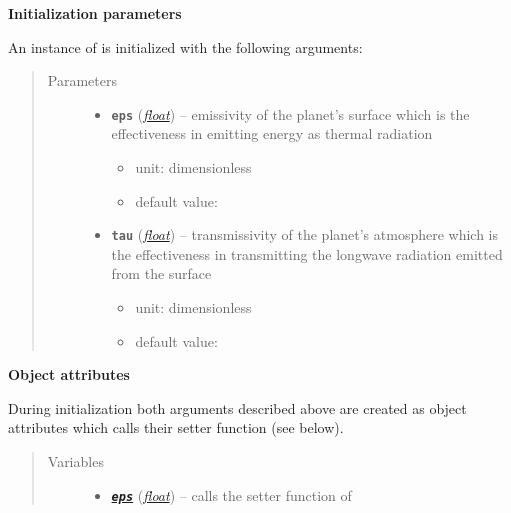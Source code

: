 \documentclass[letterpaper,10pt,english]{sphinxmanual}
\begin{document}
\begin{fulllineitems}
\textbf{Initialization parameters}

An instance of  is initialized with the following 
arguments:
\begin{quote}\begin{description}
\item[{Parameters}] \leavevmode\begin{itemize}
\item {} 
\textbf{\texttt{eps}} (\href{http://docs.python.org/2.7/library/functions.html\#float}{\emph{float}}) -- 
emissivity of the planet's surface which is the
effectiveness in emitting energy as thermal radiation
\begin{itemize}
\item {} 
unit: dimensionless

\item {} 
default value: 

\end{itemize}


\item {} 
\textbf{\texttt{tau}} (\href{http://docs.python.org/2.7/library/functions.html\#float}{\emph{float}}) -- 
transmissivity of the planet's atmosphere which is the 
effectiveness in transmitting the longwave radiation
emitted from the surface
\begin{itemize}
\item {} 
unit: dimensionless

\item {} 
default value: 

\end{itemize}


\end{itemize}

\end{description}\end{quote}

\textbf{Object attributes}

During initialization both arguments described above are created as object 
attributes which calls their setter function (see below).
\begin{quote}\begin{description}
\item[{Variables}] \leavevmode\begin{itemize}
\item {} 
{\hyperref[api/climlab.radiation:climlab.radiation.Boltzmann.Boltzmann.eps]{\emph{\textbf{\texttt{eps}}}}} (\href{http://docs.python.org/2.7/library/functions.html\#float}{\emph{float}}) -- calls the setter function of {\hyperref[api/climlab.radiation:climlab.radiation.Boltzmann.Boltzmann.eps]{\emph{}}}


\end{itemize}
\end{description}
\end{quote}
\end{fulllineitems}
\end{document}
